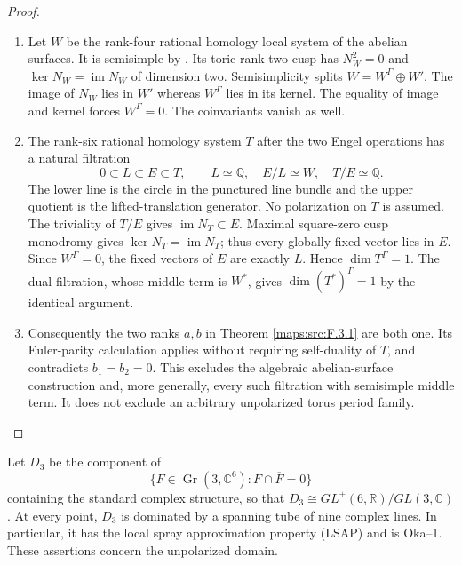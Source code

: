 \begin{proof}
\begin{enumerate}[label={$\langle1\rangle$\arabic*.}]
\item Let $W$ be the rank-four rational homology local system of the
abelian surfaces.  It is semisimple by
\cite[Definition 4.2.4 and Proposition 4.2.5, p.~44; Theorem 4.2.6, p.~45]{ffDeligne}.
Its toric-rank-two cusp has
$N_W^2=0$ and $\ker N_W=\operatorname{im}N_W$ of dimension two.
Semisimplicity splits $W=W^\Gamma\oplus W'$.
The image of $N_W$ lies in $W'$ whereas $W^\Gamma$ lies in its
kernel.  The equality of image and kernel forces $W^\Gamma=0$.
The coinvariants vanish as well.

\item The rank-six rational homology system $T$ after the two Engel
operations has a natural filtration
\[
 0\subset L\subset E\subset T,\qquad
 L\simeq\mathbb Q,\quad E/L\simeq W,\quad T/E\simeq\mathbb Q.
\]
The lower line is the circle in the punctured line bundle and
the upper quotient is the lifted-translation generator.
No polarization on $T$ is assumed.
The triviality of $T/E$ gives $\operatorname{im}N_T\subset E$.
Maximal square-zero cusp monodromy gives
$\ker N_T=\operatorname{im}N_T$; thus every globally fixed vector
lies in $E$.  Since $W^\Gamma=0$, the fixed vectors of $E$ are
exactly $L$.  Hence $\dim T^\Gamma=1$.
The dual filtration, whose middle term is $W^*$, gives
$\dim(T^*)^\Gamma=1$ by the identical argument.

\item Consequently the two ranks $a,b$ in Theorem \ref{maps:src:F.3.1} are both one.
Its Euler-parity calculation applies without requiring self-duality
of $T$, and contradicts $b_1=b_2=0$.
This excludes the algebraic abelian-surface construction and,
more generally, every such filtration with semisimple middle term.
It does not exclude an arbitrary unpolarized torus period family.

\end{enumerate}
\end{proof}




\begin{theorem}\hypertarget{tag-02OA}{}\label{maps:src:F.3.8}


Let $D_3$ be the component of
\[
 \{F\in\operatorname{Gr}(3,\mathbb C^6):F\cap\overline F=0\}
\]
containing the standard complex structure, so that
$D_3\cong GL^+(6,\mathbb R)/GL(3,\mathbb C)$.
At every point, $D_3$
is dominated by a spanning tube of nine complex lines.  In particular,
it has the local spray approximation property (LSAP) and is Oka--1.
These assertions concern the unpolarized domain.

\end{theorem}



